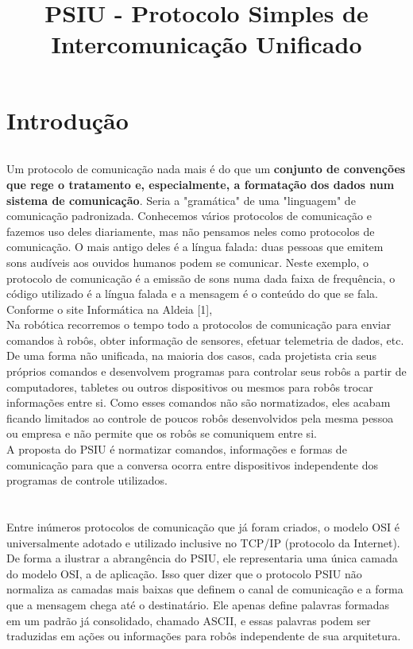 \documentclass[11pt,a4paper]{article}
\begin{document}
\title{PSIU - Protocolo Simples de Intercomunicação
Unificado}
\maketitle

\part*{Introdução \newline}

\paragraph*{} Um protocolo de comunicação nada mais é do que um \textbf{ conjunto de convenções que rege o tratamento e, especialmente, a formatação dos dados num sistema de comunicação}. Seria a "gramática" de uma "linguagem" de comunicação padronizada. Conhecemos vários protocolos de comunicação e fazemos uso deles diariamente, mas não pensamos neles como protocolos de comunicação. O mais antigo deles é a língua falada: duas pessoas que emitem sons audíveis aos ouvidos humanos podem se comunicar. Neste exemplo, o protocolo de comunicação é a emissão de sons numa dada faixa de frequência, o código utilizado é a língua falada e a mensagem é o conteúdo do que se fala. Conforme o site Informática na Aldeia [1], \\

Na robótica recorremos o tempo todo a protocolos de comunicação para enviar comandos à robôs, obter informação de sensores, efetuar telemetria de dados, etc. De uma forma não unificada, na maioria dos casos, cada projetista cria seus próprios comandos e desenvolvem programas para controlar seus robôs a partir de computadores, tabletes ou outros dispositivos ou mesmos para robôs trocar informações entre si. 
Como esses comandos não são normatizados, eles acabam ficando limitados ao controle de poucos robôs desenvolvidos pela mesma pessoa ou empresa e não permite que os robôs se comuniquem entre si.\\

A proposta do PSIU é normatizar comandos, informações e formas de comunicação para que a conversa ocorra entre dispositivos independente dos programas de controle utilizados.\\ \\ \\

Entre inúmeros protocolos de comunicação que já foram criados, o modelo OSI é universalmente adotado e utilizado inclusive no TCP/IP (protocolo da Internet). De forma a ilustrar a abrangência do PSIU, ele representaria uma única camada do modelo OSI, a de aplicação. Isso quer dizer que o protocolo PSIU não normaliza as camadas mais baixas que definem o canal de comunicação e a forma que a mensagem chega até o destinatário. Ele apenas define palavras formadas em um padrão já consolidado, chamado ASCII, e essas palavras podem ser traduzidas em ações ou informações para robôs independente de sua arquitetura.\\
\end{document}
